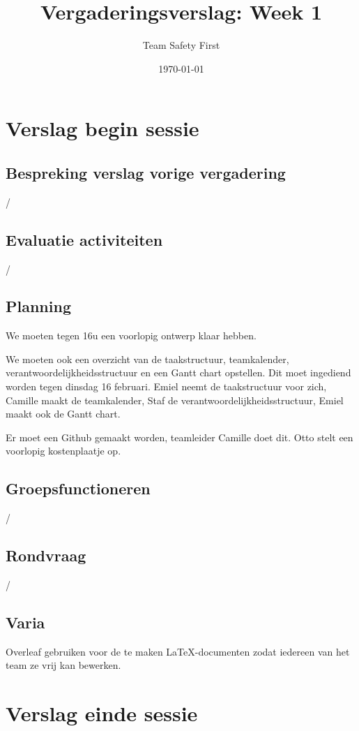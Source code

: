 \documentclass[a4paper,kulak]{kulakarticle} %
\date{\today}
\title{Vergaderingsverslag: Week 1}
\author{Team Safety First}
\begin{document}
\maketitle

\section{Verslag begin sessie}

\subsection{Bespreking verslag vorige vergadering}
/
\subsection{Evaluatie activiteiten}
/
\subsection{Planning}
We moeten tegen 16u een voorlopig ontwerp klaar hebben.

We moeten ook een overzicht van de  taakstructuur, teamkalender, verantwoordelijkheidsstructuur en een Gantt chart opstellen. Dit moet ingediend worden tegen dinsdag 16 februari. Emiel neemt de taakstructuur voor zich, Camille maakt de teamkalender, Staf de verantwoordelijkheidsstructuur, Emiel maakt ook de Gantt chart.

Er moet een Github gemaakt worden, teamleider Camille doet dit. Otto stelt een voorlopig kostenplaatje op.

\subsection{Groepsfunctioneren}
/

\subsection{Rondvraag}
/

\subsection{Varia}
Overleaf gebruiken voor de te maken \LaTeX-documenten zodat iedereen van het team ze vrij kan bewerken.


\section{Verslag einde sessie}
\end{document}

